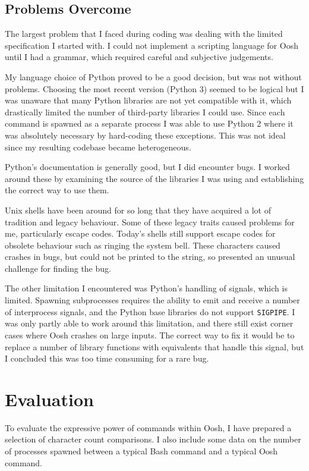 \documentclass[12pt,twoside,notitlepage]{report}
\begin{document}
\section{Problems Overcome}

The largest problem that I faced during coding was dealing with the limited
specification I started with. I could not implement a scripting
language for Oosh until I had a grammar, which required careful and
subjective judgements.

My language choice of Python proved to be a good decision, but was not
without problems. Choosing the most recent version (Python 3) seemed
to be logical but I was unaware that many Python libraries are not yet
compatible with it, which drastically limited the number of
third-party libraries I could use. Since each command is spawned as a
separate process I was able to use Python 2 where it was absolutely
necessary by hard-coding these exceptions. This was not ideal since my
resulting codebase became heterogeneous.

Python's documentation is generally good, but I did encounter bugs. I
worked around these by examining the source of the libraries I was
using and establishing the correct way to use them.

Unix shells have been around for so long that they have acquired a lot
of tradition and legacy behaviour. Some of these legacy traits caused
problems for me, particularly escape codes. Today's shells still
support escape codes for obsolete behaviour such as ringing the system
bell. These characters caused crashes in bugs, but could not be
printed to the string, so presented an unusual challenge for finding
the bug.

The other limitation I encountered was Python's handling of signals,
which is limited. Spawning subprocesses requires the ability to emit
and receive a number of interprocess signals, and the Python base
libraries do not support {\tt SIGPIPE}. I was only partly able to work
around this limitation, and there still exist corner cases where Oosh
crashes on large inputs. The correct way to fix it would be to replace
a number of library functions with equivalents that handle this
signal, but I concluded this was too time consuming for a rare bug.

\cleardoublepage

\chapter{Evaluation}
To evaluate the expressive power of commands within Oosh, I have prepared a
selection of character count comparisons. I also include some data on the
number of processes spawned between a typical Bash command and a typical Oosh
command.
\end{document}
